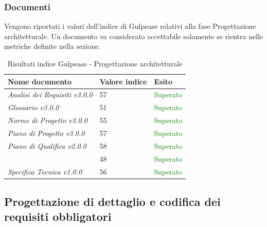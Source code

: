 	 	\subsubsection{Documenti}	 	
	 	Vengono riportati i valori dell'indice di Gulpease relativi alla fase Progettazione architetturale. Un documento va considerato accettabile solamente se rientra nelle metriche definite nella sezione.
		\begin{table}[!ht]
			\begin{center}
				\begin{tabularx}{0.9\textwidth}{|l|l|X|}
					\hline
					\textbf{Nome documento} & \textbf{Valore indice} & \textbf{Esito}\\
					\hline						
					\emph{Analisi dei Requisiti v3.0.0} & 57 & \textcolor{green}{Superato}\\
					\hline
					\emph{Glossario v3.0.0} & 51 & \textcolor{green}{Superato}\\
					\hline					
					\emph{Norme di Progetto v3.0.0} & 55 & \textcolor{green}{Superato}\\
					\hline					
					\emph{Piano di Progetto v3.0.0} & 57 & \textcolor{green}{Superato}\\
					\hline					
					\emph{Piano di Qualifica v2.0.0} & 58 & \textcolor{green}{Superato}\\
					\hline					
					\docNameVersionSdF & 48 & \textcolor{green}{Superato}\\
					\hline	
					\emph{Specifica Tecnica v1.0.0}  & 56 & \textcolor{green}{Superato}\\
					\hline			
				\end{tabularx}
			\end{center}
			\caption{Risultati indice Gulpease - Progettazione architetturale}
		\end{table}
		
	\subsection{Progettazione di dettaglio e codifica dei requisiti obbligatori}
		\label{sub:progettazione_di_dettaglio_e_codifica_requisiti_obbligatori}
